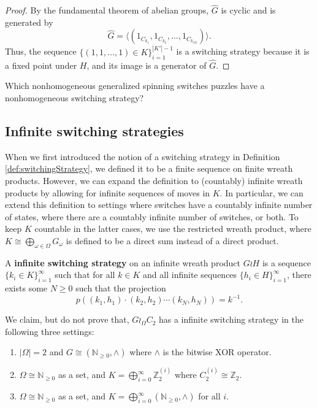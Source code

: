 \begin{proof}
  By the fundamental theorem of abelian groups, $\hat{G}$ is cyclic and is
  generated by \begin{equation}
    \hat{G} = \langle(1_{C_{k_1}}, 1_{C_{k_2}}, \dots, 1_{C_{k_{|\Omega|}}})\rangle.
  \end{equation}
  Thus, the sequence $\{(1,1,\dots,1) \in K\}_{i=1}^{|K'|-1}$ is a switching
  strategy because it is a fixed point under $H$, and its image is a generator
  of $\hat{G}$.
\end{proof}

\begin{openquestion}
  Which nonhomogeneous generalized spinning switches puzzles have
  a nonhomogeneous switching strategy?
\end{openquestion}

\subsection{Infinite switching strategies}
When we first introduced the notion of a switching strategy in
Definition \ref{def:switchingStrategy},
we defined it to be a finite sequence on finite wreath products.
However, we can expand the definition to (countably) infinite wreath products
by allowing for infinite sequences of moves in $K$.
In particular, we can extend this definition to settings where
switches have a countably infinite number of states,
where there are a countably infinite number of switches,
or both.
To keep $K$ countable in the latter cases,
we use the restricted wreath product, where
$K \cong \bigoplus_{\omega \in \Omega} G_\omega$ is defined to be a direct
sum instead of a direct product.

\begin{definition}
  A \textbf{infinite switching strategy} on an infinite wreath product $G \wr H$
  is a sequence $\{k_i \in K\}_{i=1}^\infty$ such that for all $k \in K$ and
  all infinite sequences ${\{h_i \in H\}_{i=1}^\infty}$,
  there exists some $N \geq 0$ such that the projection \begin{equation}
    p((k_1, h_1)\cdot(k_2, h_2)\cdots(k_N, h_N)) = k^{-1}.
  \end{equation}
\end{definition}

We claim, but do not prove that, $G \wr_\Omega C_2$ has a infinite switching
strategy in the following three settings: \begin{enumerate}
  \item $|\Omega| = 2$ and $G \cong (\mathbb N_{\geq 0}, \wedge)$ where $\wedge$ is the bitwise XOR operator.
  \item $\Omega \cong \mathbb N_{\geq 0}$ as a set, and $K = \bigoplus_{i=0}^\infty \mathbb Z_2^{(i)}$ where $C_2^{(i)} \cong \mathbb Z_2$.
  \item $\Omega \cong \mathbb N_{\geq 0}$ as a set, and $K = \bigoplus_{i=0}^\infty (\mathbb N_{\geq 0}, \wedge)$ for all $i$.
\end{enumerate}

